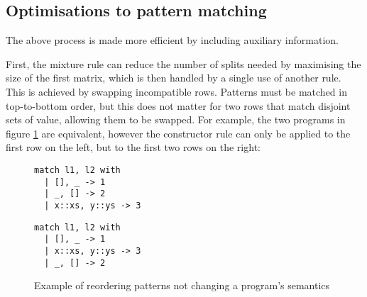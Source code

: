 


\subsection{Optimisations to pattern matching}
The above process is made more efficient by including auxiliary information. %


First, the mixture rule can reduce the number of splits needed by maximising the size of the first matrix, which is then handled by a single use of another rule. This is achieved by swapping incompatible rows. Patterns must be matched in top-to-bottom order, but this does not matter for two rows that match disjoint sets of value, allowing them to be swapped. For example, the two programs in figure \ref{fig:rowswap} are equivalent, however the constructor rule can only be applied to the first row on the left, but to the first two rows on the right:

\begin{figure}[H]
\hfill
\begin{minipage}{0.45\textwidth}
\begin{verbatim}
match l1, l2 with
  | [], _ -> 1
  | _, [] -> 2
  | x::xs, y::ys -> 3
\end{verbatim}
\end{minipage}\qquad
\begin{minipage}{0.45\textwidth}
\begin{verbatim}
match l1, l2 with
  | [], _ -> 1
  | x::xs, y::ys -> 3
  | _, [] -> 2
\end{verbatim}
\end{minipage}\hfill
\caption{Example of reordering patterns not changing a program's semantics}
\label{fig:rowswap}
\end{figure}

